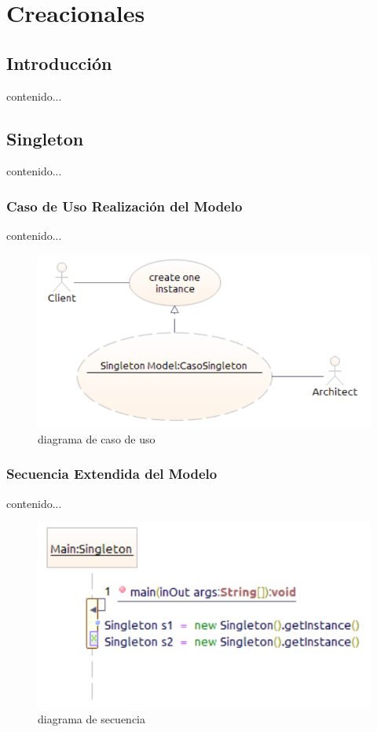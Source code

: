 \chapter{Creacionales}
\section{Introducción}
contenido...
\newpage
\section{Singleton}
contenido...
\subsection{Caso de Uso Realización del Modelo}
contenido...
\begin{figure}[th!]
	\centering
	\includegraphics[width=0.7\linewidth]{arquitectura_diseno/imgs/MCU_Singleton}
	\caption{diagrama de caso de uso}
\end{figure}
\newpage
\subsection{Secuencia Extendida del Modelo}
contenido...
\begin{figure}[th!]
	\centering
	\includegraphics[width=0.7\linewidth]{arquitectura_diseno/imgs/MSE_Singleton}
	\caption{diagrama de secuencia}
\end{figure}
\newpage
